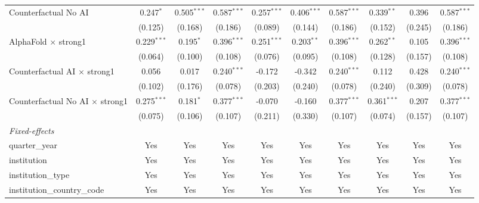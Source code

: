 \begin{tabular}{lccccccccc}
   Counterfactual No AI                   & 0.247$^{*}$   & 0.505$^{***}$ & 0.587$^{***}$ & 0.257$^{***}$ & 0.406$^{***}$ & 0.587$^{***}$ & 0.339$^{**}$  & 0.396   & 0.587$^{***}$\\   
                                          & (0.125)       & (0.168)       & (0.186)       & (0.089)       & (0.144)       & (0.186)       & (0.152)       & (0.245) & (0.186)\\   
   AlphaFold $\times$ strong1             & 0.229$^{***}$ & 0.195$^{*}$   & 0.396$^{***}$ & 0.251$^{***}$ & 0.203$^{**}$  & 0.396$^{***}$ & 0.262$^{**}$  & 0.105   & 0.396$^{***}$\\   
                                          & (0.064)       & (0.100)       & (0.108)       & (0.076)       & (0.095)       & (0.108)       & (0.128)       & (0.157) & (0.108)\\   
   Counterfactual AI $\times$ strong1     & 0.056         & 0.017         & 0.240$^{***}$ & -0.172        & -0.342        & 0.240$^{***}$ & 0.112         & 0.428   & 0.240$^{***}$\\   
                                          & (0.102)       & (0.176)       & (0.078)       & (0.203)       & (0.240)       & (0.078)       & (0.240)       & (0.309) & (0.078)\\   
   Counterfactual No AI $\times$ strong1  & 0.275$^{***}$ & 0.181$^{*}$   & 0.377$^{***}$ & -0.070        & -0.160        & 0.377$^{***}$ & 0.361$^{***}$ & 0.207   & 0.377$^{***}$\\   
                                          & (0.075)       & (0.106)       & (0.107)       & (0.211)       & (0.330)       & (0.107)       & (0.074)       & (0.157) & (0.107)\\   
   \midrule
   \emph{Fixed-effects}\\
   quarter\_year                          & Yes           & Yes           & Yes           & Yes           & Yes           & Yes           & Yes           & Yes     & Yes\\  
   institution                            & Yes           & Yes           & Yes           & Yes           & Yes           & Yes           & Yes           & Yes     & Yes\\  
   institution\_type                      & Yes           & Yes           & Yes           & Yes           & Yes           & Yes           & Yes           & Yes     & Yes\\  
   institution\_country\_code             & Yes           & Yes           & Yes           & Yes           & Yes           & Yes           & Yes           & Yes     & Yes\\  

\end{tabular}
